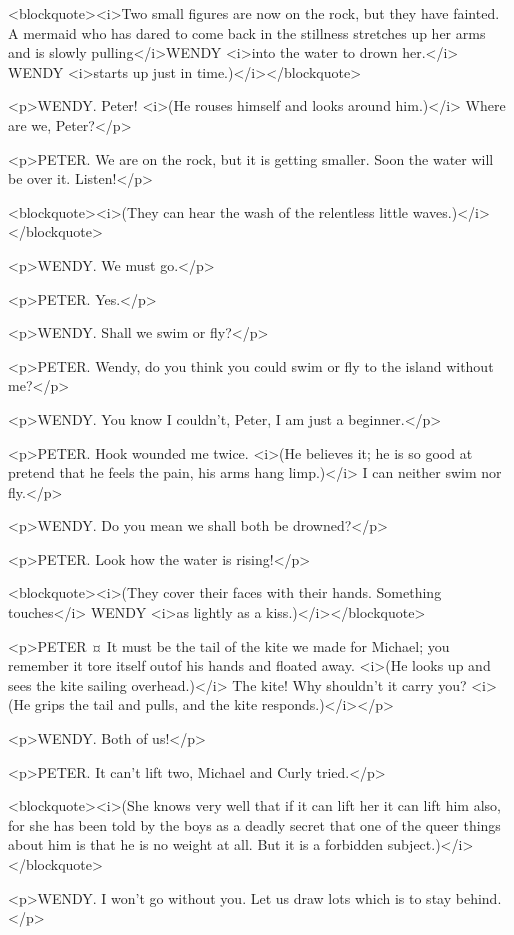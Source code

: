 <blockquote><i>Two small figures are now on the rock, but they have fainted. A mermaid who has dared to come back in the stillness stretches up her arms and is slowly pulling</i>WENDY <i>into the water to drown her.</i> WENDY <i>starts up just in time.)</i></blockquote>

<p>WENDY. Peter! <i>(He rouses himself and looks around him.)</i> Where are we, Peter?</p>

<p>PETER. We are on the rock, but it is getting smaller. Soon the water will be over it. Listen!</p>

<blockquote><i>(They can hear the wash of the relentless little waves.)</i></blockquote>

<p>WENDY. We must go.</p>

<p>PETER. Yes.</p>

<p>WENDY. Shall we swim or fly?</p>

<p>PETER. Wendy, do you think you could swim or fly to the island without me?</p>

<p>WENDY. You know I couldn't, Peter, I am just a beginner.</p>

<p>PETER. Hook wounded me twice. <i>(He believes it; he is so good at pretend that he feels the pain, his arms hang limp.)</i> I can neither swim nor fly.</p>

<p>WENDY. Do you mean we shall both be drowned?</p>

<p>PETER. Look how the water is rising!</p>

<blockquote><i>(They cover their faces with their hands. Something touches</i> WENDY <i>as lightly as a kiss.)</i></blockquote>

<p>PETER ¤
It must be the tail of the kite we made for Michael; you remember it tore itself outof his hands and floated away. <i>(He looks up and sees the kite sailing overhead.)</i> The kite! Why shouldn't it carry you? <i>(He grips the tail and pulls, and the kite responds.)</i></p>

<p>WENDY. Both of us!</p>

<p>PETER. It can't lift two, Michael and Curly tried.</p>

<blockquote><i>(She knows very well that if it can lift her it can lift him also, for she has been told by the boys as a deadly secret that one of the queer things about him is that he is no weight at all. But it is a forbidden subject.)</i></blockquote>

<p>WENDY. I won't go without you. Let us draw lots which is to stay behind.</p>

